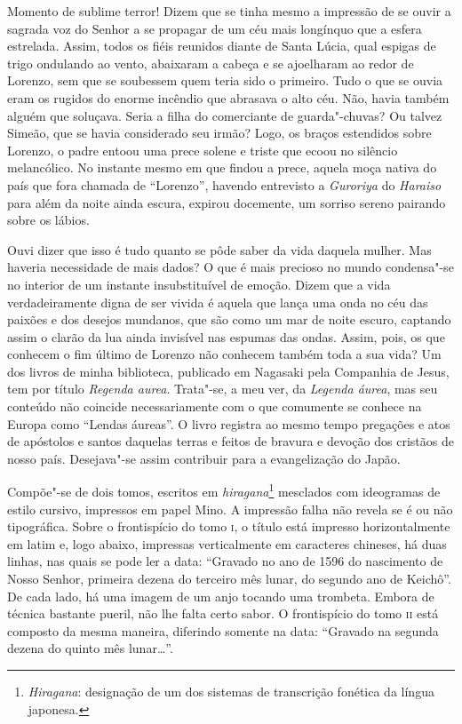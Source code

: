 Momento de sublime terror! Dizem que se tinha mesmo a impressão de se
ouvir a sagrada voz do Senhor a se propagar de um céu mais longínquo
que a esfera estrelada. Assim, todos os fiéis reunidos diante de Santa
Lúcia, qual espigas de trigo ondulando ao vento, abaixaram a cabeça e
se ajoelharam ao redor de Lorenzo, sem que se soubessem quem teria sido  
o primeiro. Tudo o que se ouvia eram os rugidos do enorme incêndio que
abrasava o alto céu. Não, havia também alguém que soluçava. Seria a
filha do comerciante de guarda"-chuvas? Ou talvez Simeão, que se havia
considerado seu irmão? Logo, os braços estendidos sobre Lorenzo, o
padre entoou uma prece solene e triste que ecoou no silêncio
melancólico. No instante mesmo em que findou a prece, aquela moça
nativa do país que fora chamada de ``Lorenzo'', havendo entrevisto a
\textit{Guroriya} do \textit{Haraiso} para além da noite ainda escura,
expirou docemente, um sorriso sereno pairando sobre os lábios.

Ouvi dizer que isso é tudo quanto se pôde saber da vida daquela mulher.
Mas haveria necessidade de mais dados? O que é mais precioso no mundo
condensa"-se no interior de um instante insubstituível de emoção. Dizem
que a vida verdadeiramente digna de ser vivida é aquela que lança uma
onda no céu das paixões e dos desejos mundanos, que são como um mar de
noite escuro, captando assim o clarão da lua ainda invisível nas
espumas das ondas. Assim, pois, os que conhecem o fim último de Lorenzo
não conhecem também toda a sua vida?
\sectionitem
Um dos livros de minha biblioteca, publicado em Nagasaki pela Companhia
de Jesus, tem por título \textit{Regenda aurea}. Trata"-se, a meu ver,
da \textit{Legenda áurea}, mas seu conteúdo não coincide
necessariamente com o que comumente se conhece na Europa como ``Lendas
áureas''. O livro registra ao mesmo tempo pregações e atos de apóstolos
e santos daquelas terras e feitos de bravura e devoção dos cristãos de 
nosso país. Desejava"-se assim contribuir para a evangelização do Japão.

Compõe"-se de dois tomos, escritos em \textit{hiragana}\footnote{ \textit{Hiragana}: 
designação de um dos sistemas de transcrição
fonética da língua japonesa.} mesclados com ideogramas de estilo
cursivo, impressos em papel Mino. A impressão falha não revela se é ou
não tipográfica. Sobre o frontispício do tomo \textsc{i}, o título está impresso
horizontalmente em latim e, logo abaixo, impressas verticalmente em
caracteres chineses, há duas linhas, nas quais se pode ler a data:
``Gravado no ano de 1596 do nascimento de Nosso Senhor, primeira dezena
do terceiro mês lunar, do segundo ano de Keichô''. De cada lado, há uma
imagem de um anjo tocando uma trombeta. Embora de técnica bastante
pueril, não lhe falta certo sabor. O frontispício do tomo \textsc{ii} está
composto da mesma maneira, diferindo somente na data: ``Gravado na
segunda dezena do quinto mês lunar\ldots{}''.

